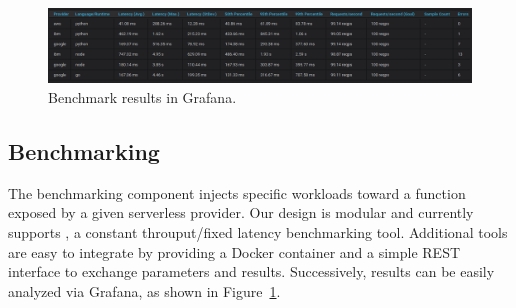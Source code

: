 

\begin{figure}[!t]
\begin{center}
\includegraphics[width=1\textwidth]{bilder/benchmark_table.png}
\caption[Benchmark results in Grafana]{Benchmark results in Grafana.}
\label{fig:benchmark_table}
\end{center}
\end{figure}

\subsection{Benchmarking}
The benchmarking component injects specific workloads toward a function exposed by a given serverless provider.
Our design is modular and currently supports , a constant throuput/fixed latency benchmarking tool. 
Additional tools are easy to integrate by providing a Docker container and a simple REST interface to exchange parameters and results. 
Successively, results can be easily analyzed via Grafana, as shown in Figure~\ref{fig:benchmark_table}.




